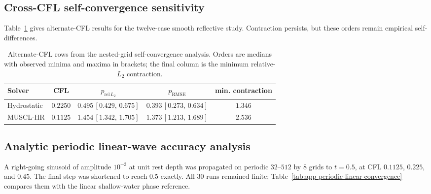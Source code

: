\FloatBarrier
\subsection{Cross-CFL self-convergence sensitivity}
\label{app:cross-cfl-convergence}

Table~\ref{tab:app-cross-cfl} gives alternate-CFL results for the twelve-case smooth reflective study. Contraction persists, but these orders remain empirical self-differences.

\begin{table}[pos=!htbp]
\centering
\caption{Alternate-CFL rows from the nested-grid self-convergence analysis. Orders are medians with observed minima and maxima in brackets; the final column is the minimum relative-$L_2$ contraction.}
\label{tab:app-cross-cfl}
\small
\begin{tabular}{lcccc}
    \toprule
    Solver & CFL & $p_{\mathrm{rel}\,L_2}$ & $p_{\mathrm{RMSE}}$ & min. contraction \\
    \midrule
    Hydrostatic & $0.2250$ & $0.495\,[0.429,\,0.675]$ & $0.393\,[0.273,\,0.634]$ & $1.346$ \\
    MUSCL-HR & $0.1125$ & $1.454\,[1.342,\,1.705]$ & $1.373\,[1.213,\,1.689]$ & $2.536$ \\
    \bottomrule
\end{tabular}
\end{table}

\FloatBarrier
\subsection{Analytic periodic linear-wave accuracy analysis}
\label{app:periodic-linear-convergence}

A right-going sinusoid of amplitude $10^{-3}$ at unit rest depth was propagated on periodic $32$--$512$ by $8$ grids to $t=0.5$, at CFL $0.1125$, $0.225$, and $0.45$. The final step was shortened to reach $0.5$ exactly. All $30$ runs remained finite; Table~\ref{tab:app-periodic-linear-convergence} compares them with the linear shallow-water phase reference.

